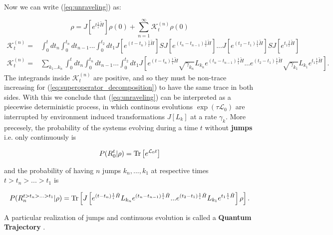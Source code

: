 Now we can write (\ref{eq:unraveling}) as:

  \begin{equation}\label{eq:superoperator_decomposition}
    \rho = J[e^{t \frac{1}{i}\tilde{H}}]\rho(0)  +  \sum_{n=1}^{\infty}\mathcal{K}^{(n)}_{t}\rho(0)
      \end{equation}
\begin{equation}
  \begin{split}
  \mathcal{K}^{(n)}_{t}=&\int_{0}^{t}dt_{n}\int_{0}^{t_{n}}dt_{n-1}...\int_{0}^{t_{2}}dt_{1}J[e^{(t-t_{n}) \frac{1}{i}\tilde{H}}]SJ[e^{(t_{n}-t_{n-1}) \frac{1}{i}\tilde{H}}]...J[e^{(t_{2}-t_{1}) \frac{1}{i}\tilde{H}}]SJ[e^{t_{1}\frac{1}{i}\tilde{H}}]\\
  \mathcal{K}^{(n)}_{t}=&\sum_{k_{1}...k_{n}}\int_{0}^{t}dt_{n}\int_{0}^{t_{n}}dt_{n-1}...\int_{0}^{t_{2}}dt_{1}J\left[e^{(t-t_{n})\frac{1}{i}\tilde{H}}\sqrt{\gamma_{k_{n}}}L_{k_{n}}e^{(t_{n}-t_{n-1})\frac{1}{i}\tilde{H}}...e^{(t_{2}-t_{1})\frac{1}{i}\tilde{H}}\sqrt{\gamma_{k_{1}}}L_{k_{1}}e^{t_{1}\frac{1}{i}\tilde{H}}\right].
  \end{split}
\end{equation}
The integrands inside $\mathcal{K}_{t}^{(n)}$ are positive, and so they must be non-trace increasing for (\ref{eq:superoperator_decomposition})
to have the same trace in both sides. With this we conclude that (\ref{eq:unraveling}) can be interpreted as a piecewise deterministic process,
in which continous evolutions $\exp(\tau\mathcal{L}_{0})$ are interrupted by environment induced transformations $J[L_{k}]$ at a rate
$\gamma_{k}$. More precesely, the probability of the systems evolving during a time $t$ without \textbf{jumps} i.e. only continuously is

\begin{equation}
  P(R_{0}^{t}|\rho) = \mathrm{Tr}\left[e^{\mathcal{L}_{0}t}\right]
\end{equation}

and the probability of having $n$ jumps $k_{n},...,k_{1}$ at respective times $t>t_{n}>...>t_{1}$ is

\begin{equation}
  P(R_{n}^{t>t_{n}>...>t_{1}}|\rho) = \mathrm{Tr}\left[J\left[e^{(t-t_{n})\frac{1}{i}\tilde{H}}L_{k_{n}}e^{(t_{n}-t_{n-1})\frac{1}{i}\tilde{H}}...e^{(t_{2}-t_{1})\frac{1}{i}\tilde{H}}L_{k_{1}}e^{t_{1}\frac{1}{i}\tilde{H}}\right]\rho\right].
\end{equation}

A particular realization of jumps and continuous evolution is called a \textbf{Quantum Trajectory} \cite{wiseman_quantum_2010,hornberger2009introduction}.

